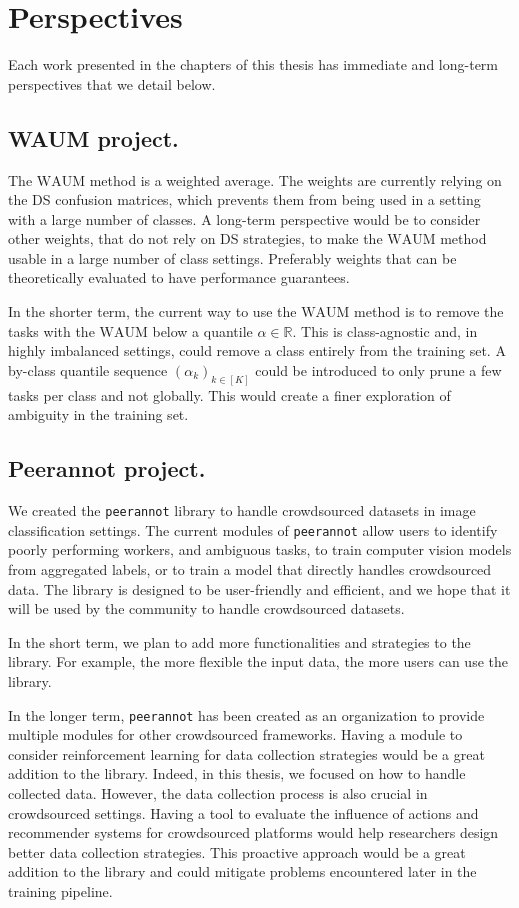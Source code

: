 \section{Perspectives}

Each work presented in the chapters of this thesis has immediate and long-term perspectives that we detail below.

\subsection{WAUM project.}

The $\mathrm{WAUM}$ method is a weighted average.
The weights are currently relying on the DS confusion matrices, which prevents them from being used in a setting with a large number of classes.
A long-term perspective would be to consider other weights, that do not rely on DS strategies, to make the $\mathrm{WAUM}$ method usable in a large number of class settings.
Preferably weights that can be theoretically evaluated to have performance guarantees.

In the shorter term, the current way to use the $\mathrm{WAUM}$ method is to remove the tasks with the $\mathrm{WAUM}$ below a quantile $\alpha\in\mathbb{R}$.
This is class-agnostic and, in highly imbalanced settings, could remove a class entirely from the training set.
A by-class quantile sequence $(\alpha_k)_{k\in [K]}$ could be introduced to only prune a few tasks per class and not globally.
This would create a finer exploration of ambiguity in the training set.

\subsection{Peerannot project.}

We created the \texttt{peerannot} library to handle crowdsourced datasets in image classification settings.
The current modules of \texttt{peerannot} allow users to identify poorly performing workers, and ambiguous tasks, to train computer vision models from aggregated labels, or to train a model that directly handles crowdsourced data.
The library is designed to be user-friendly and efficient, and we hope that it will be used by the community to handle crowdsourced datasets.

In the short term, we plan to add more functionalities and strategies to the library.
For example, the more flexible the input data, the more users can use the library.

In the longer term, \texttt{peerannot} has been created as an organization to provide multiple modules for other crowdsourced frameworks.
Having a module to consider reinforcement learning for data collection strategies would be a great addition to the library.
Indeed, in this thesis, we focused on how to handle collected data.
However, the data collection process is also crucial in crowdsourced settings.
Having a tool to evaluate the influence of actions and recommender systems for crowdsourced platforms would help researchers design better data collection strategies.
This proactive approach would be a great addition to the library and could mitigate problems encountered later in the training pipeline.

